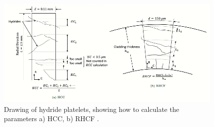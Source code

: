 \begin{figure}[h] %
    \centering
    \includegraphics[width=5.5in]{Figures/2-Parameters/parameters_drawing.png}
    \caption{Drawing of hydride platelets, showing how to calculate the parameters a) HCC, b) RHCF \cite{SIMON2021152817}.}
    \label{fig:parameters_drawing}
\end{figure}